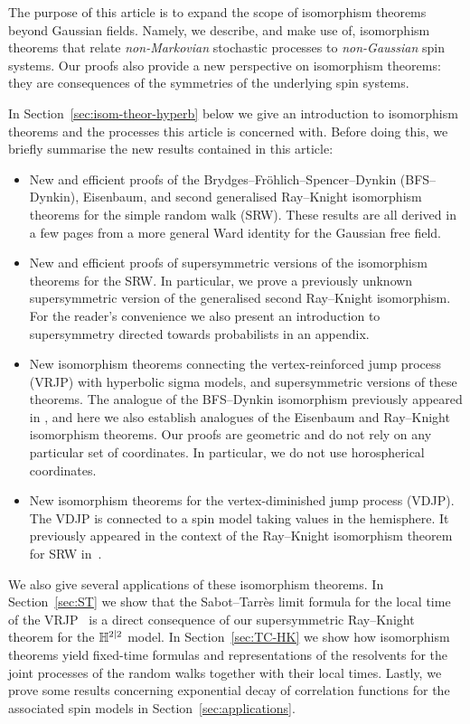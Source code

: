 \documentclass[11pt,a4paper]{article}
\begin{document}
The purpose of this article is to expand the scope of
isomorphism theorems beyond Gaussian fields. Namely, we describe,
and make use of, isomorphism theorems that relate \emph{non-Markovian}
stochastic processes to \emph{non-Gaussian} spin systems. Our
proofs also provide a new perspective on isomorphism theorems: they are
consequences of the symmetries of the underlying spin systems.

In Section~\ref{sec:isom-theor-hyperb} below we give an introduction
to isomorphism theorems and the processes this article
is concerned with. Before doing this, we briefly summarise the new results
contained in this article:
\begin{itemize}
\item New and efficient proofs of the
  Brydges--Fr\"ohlich--Spencer--Dynkin (BFS--Dynkin), Eisenbaum, and
  second generalised Ray--Knight isomorphism theorems for the simple
  random walk (SRW).  These results are all derived in a few pages
  from a more general Ward identity for the Gaussian free field.
\item New and efficient proofs of supersymmetric versions of the
  isomorphism theorems for the SRW. In particular, we prove a previously
  unknown supersymmetric version of the generalised second Ray--Knight
  isomorphism.  For the reader's convenience we also present an
  introduction to supersymmetry directed towards probabilists in an
  appendix.
\item New isomorphism theorems connecting the vertex-reinforced jump
  process (VRJP) with hyperbolic sigma models, and supersymmetric
  versions of these theorems.  The analogue of the BFS--Dynkin
  isomorphism previously appeared in \cite{1802.02077}, and here we
  also establish analogues of the Eisenbaum and Ray--Knight
  isomorphism theorems.  Our proofs are geometric and do not
  rely on any particular set of coordinates. In particular, we do
  not use horospherical coordinates.
\item New isomorphism theorems for the vertex-diminished jump process
  (VDJP).  The VDJP is connected to a spin model taking values in the
  hemisphere.  It previously appeared in the context of the
  Ray--Knight isomorphism theorem for SRW in~\cite{MR3520013}.
\end{itemize}

We also give several applications of these isomorphism theorems.  In
Section~\ref{sec:ST} we show that the Sabot--Tarr\`{e}s limit formula for
the local time of the VRJP~\cite{MR3420510} is a direct consequence of our
supersymmetric Ray--Knight theorem for the $\mathbb{H}^{2|2}$ model. In Section~\ref{sec:TC-HK} we show
how isomorphism theorems yield fixed-time formulas and representations
of the resolvents for the joint processes of the random walks
together with their local times.
Lastly, we prove some results
concerning exponential decay of correlation functions for the
associated spin models in Section~\ref{sec:applications}.
\end{document}
